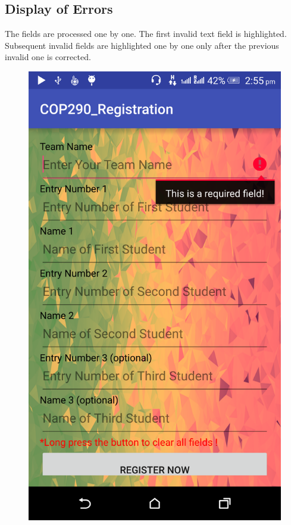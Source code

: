 \documentclass[12pt]{article}
\begin{document}
\subsection{Display of Errors}
The fields are processed one by one. The first invalid text field is highlighted. Subsequent invalid fields are highlighted one by one only after the previous invalid one is corrected.\\   
\begin{figure}[!htb]
  \centering
  \begin{minipage}[b]{0.4\textwidth}
    \includegraphics[width=\textwidth]{images/empty.png}

\end{minipage}
\end{figure}
\end{document}
